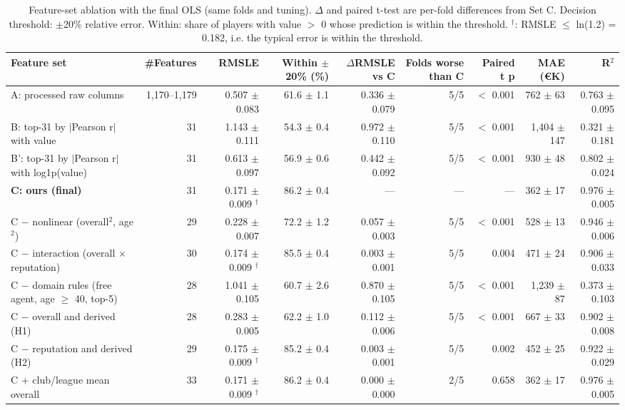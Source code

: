 \begin{table}[t]
\centering
\small
\begin{tabular}{lrrrrrrrr}
\toprule
Feature set & \#Features & RMSLE & Within $\pm$20\% (\%) & $\Delta$RMSLE vs C & Folds worse than C & Paired t p & MAE (\euro{}K) & R$^2$ \\
\midrule
A: processed raw columns & 1,170--1,179 & 0.507 $\pm$ 0.083 & 61.6 $\pm$ 1.1 & 0.336 $\pm$ 0.079 & 5/5 & $<$ 0.001 & 762 $\pm$ 63 & 0.763 $\pm$ 0.095 \\
B: top-31 by $|$Pearson r$|$ with value & 31 & 1.143 $\pm$ 0.111 & 54.3 $\pm$ 0.4 & 0.972 $\pm$ 0.110 & 5/5 & $<$ 0.001 & 1,404 $\pm$ 147 & 0.321 $\pm$ 0.181 \\
B': top-31 by $|$Pearson r$|$ with log1p(value) & 31 & 0.613 $\pm$ 0.097 & 56.9 $\pm$ 0.6 & 0.442 $\pm$ 0.092 & 5/5 & $<$ 0.001 & 930 $\pm$ 48 & 0.802 $\pm$ 0.024 \\
\textbf{C: ours (final)} & 31 & 0.171 $\pm$ 0.009 $^\dagger$ & 86.2 $\pm$ 0.4 & --- & --- & --- & 362 $\pm$ 17 & 0.976 $\pm$ 0.005 \\
C $-$ nonlinear (overall$^2$, age$^2$) & 29 & 0.228 $\pm$ 0.007 & 72.2 $\pm$ 1.2 & 0.057 $\pm$ 0.003 & 5/5 & $<$ 0.001 & 528 $\pm$ 13 & 0.946 $\pm$ 0.006 \\
C $-$ interaction (overall $\times$ reputation) & 30 & 0.174 $\pm$ 0.009 $^\dagger$ & 85.5 $\pm$ 0.4 & 0.003 $\pm$ 0.001 & 5/5 & 0.004 & 471 $\pm$ 24 & 0.906 $\pm$ 0.033 \\
C $-$ domain rules (free agent, age $\geq$ 40, top-5) & 28 & 1.041 $\pm$ 0.105 & 60.7 $\pm$ 2.6 & 0.870 $\pm$ 0.105 & 5/5 & $<$ 0.001 & 1,239 $\pm$ 87 & 0.373 $\pm$ 0.103 \\
C $-$ overall and derived (H1) & 28 & 0.283 $\pm$ 0.005 & 62.2 $\pm$ 1.0 & 0.112 $\pm$ 0.006 & 5/5 & $<$ 0.001 & 667 $\pm$ 33 & 0.902 $\pm$ 0.008 \\
C $-$ reputation and derived (H2) & 29 & 0.175 $\pm$ 0.009 $^\dagger$ & 85.2 $\pm$ 0.4 & 0.003 $\pm$ 0.001 & 5/5 & 0.002 & 452 $\pm$ 25 & 0.922 $\pm$ 0.029 \\
C + club/league mean overall & 33 & 0.171 $\pm$ 0.009 $^\dagger$ & 86.2 $\pm$ 0.4 & 0.000 $\pm$ 0.000 & 2/5 & 0.658 & 362 $\pm$ 17 & 0.976 $\pm$ 0.005 \\
\bottomrule
\end{tabular}
\caption{Feature-set ablation with the final OLS (same folds and tuning). $\Delta$ and paired t-test are per-fold differences from Set C. Decision threshold: $\pm$20\% relative error. Within: share of players with value $>$ 0 whose prediction is within the threshold. $^\dagger$: RMSLE $\leq$ ln(1.2) = 0.182, i.e. the typical error is within the threshold.}
\label{tab:ablation}
\end{table}
